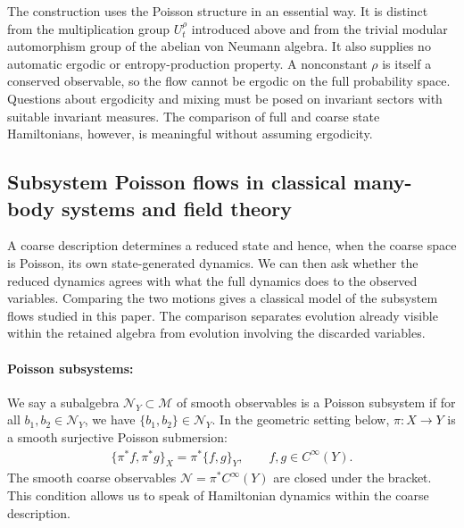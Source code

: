 \documentclass[a4paper,11pt]{article}
\theoremstyle{definition}
\newcommand{\mN}{\mathcal{N}}
\newcommand{\mM}{\mathcal{M}}
\begin{document}
The construction uses the Poisson structure in an essential way. It is distinct from the multiplication group $U_t^\rho$ introduced above and from the trivial modular automorphism group of the abelian von Neumann algebra. It also supplies no automatic ergodic or entropy-production property. A nonconstant $\rho$ is itself a conserved observable, so the flow cannot be ergodic on the full probability space. Questions about ergodicity and mixing must be posed on invariant sectors with suitable invariant measures. The comparison of full and coarse state Hamiltonians, however, is meaningful without assuming ergodicity.

\subsection{Subsystem Poisson flows in classical many-body systems and field theory}
\label{subsec:classical-subalgebra-Hamiltonian}

A coarse description determines a reduced state and hence, when the coarse space is Poisson, its own state-generated dynamics. We can then ask whether the reduced dynamics agrees with what the full dynamics does to the observed variables. Comparing the two motions gives a classical model of the subsystem flows studied in this paper. The comparison separates evolution already visible within the retained algebra from evolution involving the discarded variables.

\paragraph{Poisson subsystems:} We say a subalgebra $\mN_Y\subset \mM$ of smooth observables is a Poisson subsystem if for all $b_1,b_2\in \mN_Y$, we have $\{b_1,b_2\}\in \mN_Y$. In the geometric setting below, $\pi:X\to Y$ is a smooth surjective Poisson submersion:
\begin{align}\label{eq:classical-Poisson-subsystem}
    \{\pi^*f,\pi^*g\}_X=\pi^*\{f,g\}_Y,
    \qquad f,g\in C^\infty(Y).
\end{align}
The smooth coarse observables $\mN=\pi^*C^\infty(Y)$ are closed under the bracket. This condition allows us to speak of Hamiltonian dynamics within the coarse description.
\end{document}
